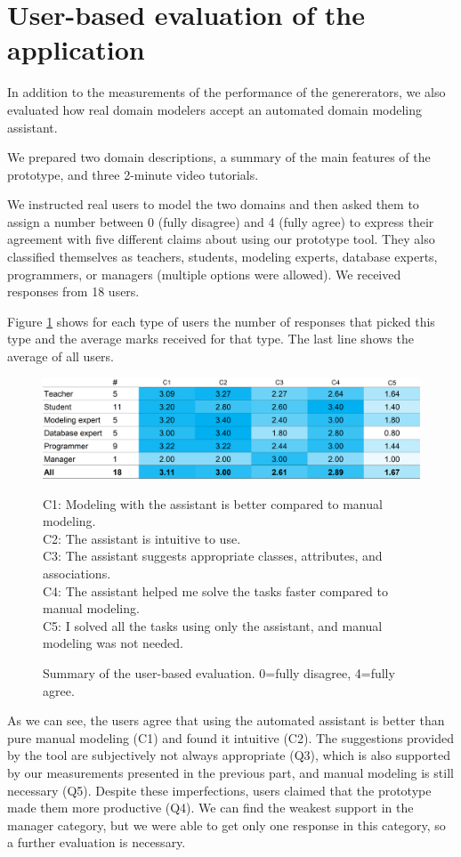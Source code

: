 \section{User-based evaluation of the application}

In addition to the measurements of the performance of the genererators, we also evaluated how real domain modelers accept an automated domain modeling assistant.

We prepared two domain descriptions, a summary of the main features of the prototype, and three 2-minute video tutorials.

We instructed real users to model the two domains and then asked them to assign a number between 0 (fully disagree) and 4 (fully agree) to express their agreement with five different claims about using our prototype tool.
They also classified themselves as teachers, students, modeling experts, database experts, programmers, or managers (multiple options were allowed).
We received responses from 18 users.

Figure \ref{fig:user-based-evaluation} shows for each type of users the number of responses that picked this type and the average marks received for that type. The last line shows the average of all users.

\begin{figure}[!h]
    \includegraphics[width=1\linewidth]{img/user-based-evaluation.png} \\
    \scriptsize
\raggedright{C1: Modeling with the assistant is better compared to manual modeling. \\
C2: The assistant is intuitive to use.\\
C3: The assistant suggests appropriate classes, attributes, and associations.\\
C4: The assistant helped me solve the tasks faster compared to manual modeling.\\
C5: I solved all the tasks using only the assistant, and manual modeling was not needed.}
    \caption{Summary of the user-based evaluation. 0=fully disagree, 4=fully agree.}
    \label{fig:user-based-evaluation}
\end{figure}

As we can see, the users agree that using the automated assistant is better than pure manual modeling (C1) and found it intuitive (C2).
The suggestions provided by the tool are subjectively not always appropriate (Q3), which is also supported by our measurements presented in the previous part, and manual modeling is still necessary (Q5).
Despite these imperfections, users claimed that the prototype made them more productive (Q4).
We can find the weakest support in the manager category, but we were able to get only one response in this category, so a further evaluation is necessary.